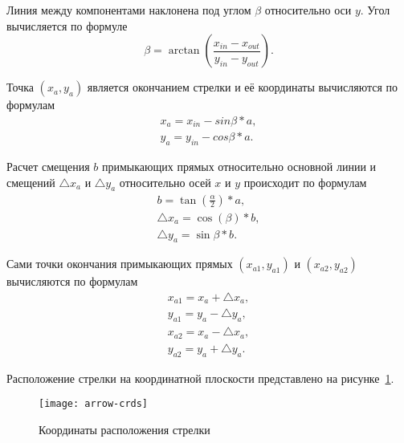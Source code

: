 {Линия между компонентами наклонена под углом $ \beta $ относительно оси $ y $. Угол
вычисляется по формуле
\begin{equation}
	\beta = \arctan(\frac{x_{in} - x_{out}}{y_{in} - y_{out}}).
\end{equation}

Точка
$ (x_a, y_a) $ является окончанием стрелки и её координаты вычисляются по формулам
\begin{gather}
	x_a = x_{in} - sin \beta * a, \\
	y_a = y_{in} - cos \beta * a.
\end{gather}


Расчет смещения $b$ примыкающих прямых относительно основной линии и
смещений $\bigtriangleup x_a$
и $\bigtriangleup y_a$ относительно осей $x$ и $y$ происходит по формулам
\begin{gather}
	b = \tan(\frac{\alpha}{2})*a, \\
	\bigtriangleup x_a = \cos(\beta) * b, \\
	\bigtriangleup y_a = \sin{\beta} * b.
\end{gather}


Сами точки окончания примыкающих прямых
$ (x_{a1}, y_{a1}) $ и $ (x_{a2}, y_{a2}) $
вычисляются по формулам
\begin{gather}
	x_{a1} = x_a + \bigtriangleup x_a, \\
	y_{a1} = y_a - \bigtriangleup y_a, \\
	x_{a2} = x_a - \bigtriangleup x_a, \\
	y_{a2} = y_a + \bigtriangleup y_a.
\end{gather}

Расположение стрелки на координатной плоскости представлено
на рисунке~\ref{f:arrow-crds}.

\begin{figure}[h]
	\centering
	\texttt{[image: arrow-crds]}
	\caption{Координаты расположения стрелки}
	\label{f:arrow-crds}
\end{figure}


}
